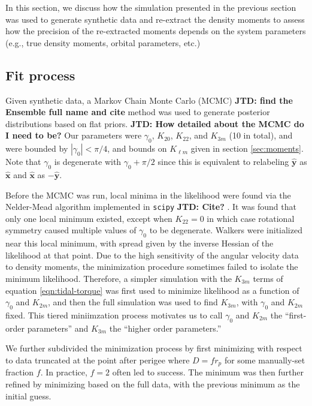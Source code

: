 \documentclass[fleqn,usenatbib]{mnras}
\newcommand{\jtd}[1]{ {\bf{\color{red} JTD: #1}} }
\newcommand{\unit}[1]{\bm{\hat{#1}}}
\begin{document}
In this section, we discuss how the simulation presented in the previous section was used to generate synthetic data and re-extract the density moments to assess how the precision of the re-extracted moments depends on the system parameters (e.g., true density moments, orbital parameters, etc.)

\subsection{Fit process}
\label{sec:fit}
Given synthetic data, a Markov Chain Monte Carlo (MCMC) \jtd{find the Ensemble full name and cite} method was used to generate posterior distributions based on flat priors. \jtd{How detailed about the MCMC do I need to be?} Our parameters were $\gamma_0$, $K_{20}$, $K_{22}$, and $K_{3m}$ (10 in total), and were bounded by $|\gamma_0| < \pi/4$, and bounds on $K_{\ell m}$ given in section \ref{sec:moments}. Note that $\gamma_0$ is degenerate with $\gamma_0 + \pi/2$ since this is equivalent to relabeling $\unit y$ as $\unit x$ and $\unit x$ as $-\unit y$.

Before the MCMC was run, local minima in the likelihood were found via the Nelder-Mead algorithm implemented in \texttt{scipy} \jtd{Cite?}. It was found that only one local minimum existed, except when $K_{22}=0$ in which case rotational symmetry caused multiple values of $\gamma_0$ to be degenerate. Walkers were initialized near this local minimum, with spread given by the inverse Hessian of the likelihood at that point. Due to the high sensitivity of the angular velocity data to density moments, the minimization procedure sometimes failed to isolate the minimum likelihood. Therefore, a simpler simulation with the $K_{3m}$ terms of equation \ref{eqn:tidal-torque} was first used to minimize likelihood as a function of $\gamma_0$ and $K_{2m}$, and then the full simulation was used to find $K_{3m}$, with $\gamma_0$ and $K_{2m}$ fixed. This tiered miniimzation process motivates us to call $\gamma_0$ and $K_{2m}$ the ``first-order parameters'' and $K_{3m}$ the ``higher order parameters.''

We further subdivided the minimization process by first minimizing with respect to data truncated at the point after perigee where $D=fr_p$ for some manually-set fraction $f$. In practice, $f=2$ often led to success. The minimum was then further refined by minimizing based on the full data, with the previous minimum as the initial guess.
\end{document}

